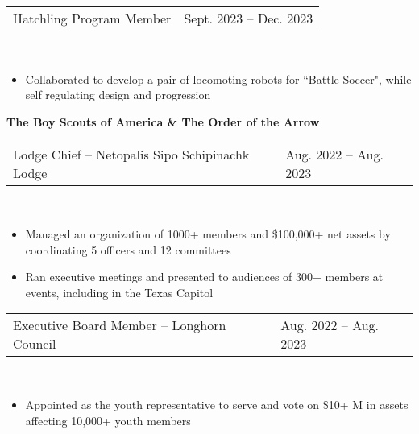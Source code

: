 \documentclass[18pt]{article}
\begin{document}
\vspace{-0.5\baselineskip}

\begin{tabular}{p{} p{}}
    Hatchling Program Member &
    \hfill Sept. 2023 – Dec. 2023
\end{tabular}\\

\vspace{-0.5\baselineskip}
\begin{itemize}[noitemsep]
    \vspace{-\baselineskip}
    \item Collaborated to develop a pair of locomoting robots for “Battle Soccer", while self regulating design and progression 
    \vspace{-0.5\baselineskip}
\end{itemize}

\textbf{The Boy Scouts of America \& The Order of the Arrow}\\

\vspace{-\baselineskip}
\begin{tabular}{p{} p{}}
    Lodge Chief – Netopalis Sipo Schipinachk Lodge
    &\hfill Aug. 2022 – Aug. 2023
\end{tabular}\\

\vspace{-0.5\baselineskip}
\begin{itemize}[noitemsep]
  \vspace{-\baselineskip}
  \item Managed an organization of 1000+ members and \$100,000+ net assets by coordinating 5 officers and 12 committees
  \item Ran executive meetings and presented to audiences of 300+ members at events, including in the Texas Capitol 
  \vspace{-0.5\baselineskip}
\end{itemize}


\begin{tabular}{p{} p{} }
    Executive Board Member – Longhorn Council
    &\hfill Aug. 2022 – Aug. 2023
\end{tabular}\\

\vspace{-0.5\baselineskip}
\begin{itemize}[noitemsep]
  \vspace{-\baselineskip}
  \item Appointed as the youth representative to serve and vote on \$10+ M in assets affecting 10,000+ youth members
  
\end{itemize}
\end{document}
